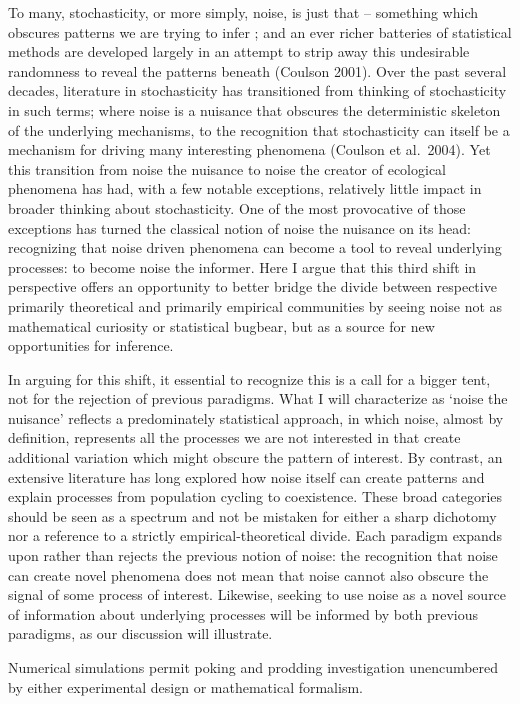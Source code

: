 \documentclass[
  authoryear,
  preprint]{elsarticle}
\begin{document}
To many, stochasticity, or more simply, noise, is just that -- something
which obscures patterns we are trying to infer \citep{Knape2011}; and an
ever richer batteries of statistical methods are developed largely in an
attempt to strip away this undesirable randomness to reveal the patterns
beneath (Coulson 2001). Over the past several decades, literature in
stochasticity has transitioned from thinking of stochasticity in such
terms; where noise is a nuisance that obscures the deterministic
skeleton of the underlying mechanisms, to the recognition that
stochasticity can itself be a mechanism for driving many interesting
phenomena (Coulson et al.~2004). Yet this transition from noise the
nuisance to noise the creator of ecological phenomena has had, with a
few notable exceptions, relatively little impact in broader thinking
about stochasticity. One of the most provocative of those exceptions has
turned the classical notion of noise the nuisance on its head:
recognizing that noise driven phenomena can become a tool to reveal
underlying processes: to become noise the informer. Here I argue that
this third shift in perspective offers an opportunity to better bridge
the divide between respective primarily theoretical and primarily
empirical communities by seeing noise not as mathematical curiosity or
statistical bugbear, but as a source for new opportunities for
inference.

In arguing for this shift, it essential to recognize this is a call for
a bigger tent, not for the rejection of previous paradigms. What I will
characterize as `noise the nuisance' reflects a predominately
statistical approach, in which noise, almost by definition, represents
all the processes we are not interested in that create additional
variation which might obscure the pattern of interest. By contrast, an
extensive literature has long explored how noise itself can create
patterns and explain processes from population cycling to coexistence.
These broad categories should be seen as a spectrum and not be mistaken
for either a sharp dichotomy nor a reference to a strictly
empirical-theoretical divide. Each paradigm expands upon rather than
rejects the previous notion of noise: the recognition that noise can
create novel phenomena does not mean that noise cannot also obscure the
signal of some process of interest. Likewise, seeking to use noise as a
novel source of information about underlying processes will be informed
by both previous paradigms, as our discussion will illustrate.

Numerical simulations permit poking and prodding investigation
unencumbered by either experimental design or mathematical formalism.
\end{document}

